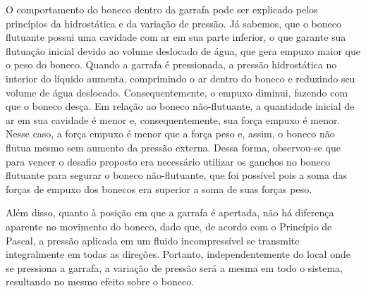 O comportamento do boneco dentro da garrafa pode ser explicado pelos princípios
da hidrostática e da variação de pressão. Já sabemos, que o boneco flutuante possui uma
cavidade com ar em sua parte inferior, o que garante sua flutuação inicial
devido ao volume deslocado de água, que gera empuxo maior que o peso do boneco.
Quando a garrafa é pressionada, a pressão hidrostática no interior do líquido
aumenta, comprimindo o ar dentro do boneco e reduzindo seu volume de água
deslocado. Consequentemente, o empuxo diminui, fazendo com que o boneco desça.
Em relação ao boneco não-flutuante, a quantidade inicial de ar em sua cavidade
é menor e, consequentemente, sua força empuxo é menor. Nesse caso, a força
empuxo é menor que a força peso e, assim, o boneco não flutua mesmo sem aumento
da pressão externa. Dessa forma, observou-se que para vencer o desafio
proposto era necessário utilizar os ganchos no boneco flutuante para segurar o
boneco não-flutuante, que foi possível pois a soma das forças de empuxo dos
bonecos era superior a soma de suas forças peso.

Além disso, quanto à posição em que a garrafa é apertada, não há diferença
aparente no movimento do boneco, dado que, de acordo com o Princípio de Pascal,
a pressão aplicada em um fluido incompressível se transmite integralmente em
todas as direções. Portanto, independentemente do local onde se pressiona a
garrafa, a variação de pressão será a mesma em todo o sistema, resultando no
mesmo efeito sobre o boneco.

